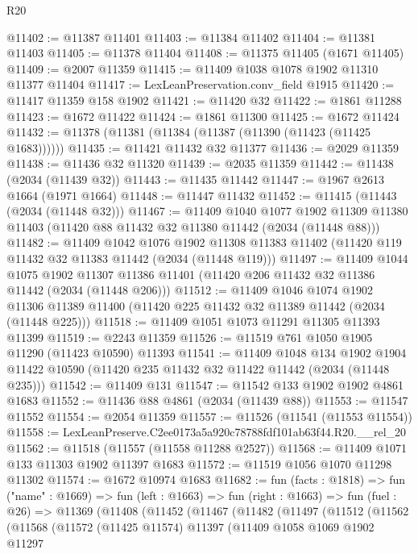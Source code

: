 \begin{lexlean}{R20}
\begin{coremodule}
@11402 := @11387 @11401
@11403 := @11384 @11402
@11404 := @11381 @11403
@11405 := @11378 @11404
@11408 := @11375 @11405 (@1671 @11405)
@11409 := @2007 @11359
@11415 := @11409 @1038 @1078 @1902 @11310 @11377 @11404
@11417 := LexLeanPreservation.conv_field @1915
@11420 := @11417 @11359 @158 @1902
@11421 := @11420 @32
@11422 := @1861 @11288
@11423 := @1672 @11422
@11424 := @1861 @11300
@11425 := @1672 @11424
@11432 := @11378 (@11381 (@11384 (@11387 (@11390 (@11423 (@11425 @1683))))))
@11435 := @11421 @11432 @32 @11377
@11436 := @2029 @11359
@11438 := @11436 @32 @11320
@11439 := @2035 @11359
@11442 := @11438 (@2034 (@11439 @32))
@11443 := @11435 @11442
@11447 := @1967 @2613 @1664 (@1971 @1664)
@11448 := @11447 @11432
@11452 := @11415 (@11443 (@2034 (@11448 @32)))
@11467 := @11409
    @1040
    @1077
    @1902
    @11309
    @11380
    @11403
    (@11420 @88 @11432 @32 @11380 @11442 (@2034 (@11448 @88)))
@11482 := @11409
    @1042
    @1076
    @1902
    @11308
    @11383
    @11402
    (@11420 @119 @11432 @32 @11383 @11442 (@2034 (@11448 @119)))
@11497 := @11409
    @1044
    @1075
    @1902
    @11307
    @11386
    @11401
    (@11420 @206 @11432 @32 @11386 @11442 (@2034 (@11448 @206)))
@11512 := @11409
    @1046
    @1074
    @1902
    @11306
    @11389
    @11400
    (@11420 @225 @11432 @32 @11389 @11442 (@2034 (@11448 @225)))
@11518 := @11409 @1051 @1073 @11291 @11305 @11393 @11399
@11519 := @2243 @11359
@11526 := @11519 @761 @1050 @1905 @11290 (@11423 @10590) @11393
@11541 := @11409
    @1048
    @134
    @1902
    @1904
    @11422
    @10590
    (@11420 @235 @11432 @32 @11422 @11442 (@2034 (@11448 @235)))
@11542 := @11409 @131
@11547 := @11542 @133 @1902 @1902 @4861 @1683
@11552 := @11436 @88 @4861 (@2034 (@11439 @88))
@11553 := @11547 @11552
@11554 := @2054 @11359
@11557 := @11526 (@11541 (@11553 @11554))
@11558 := LexLeanPreserve.C2ee0173a5a920c78788fdf101ab63f44.R20.__rel_20
@11562 := @11518 (@11557 (@11558 @11288 @2527))
@11568 := @11409 @1071 @133 @11303 @1902 @11397 @1683
@11572 := @11519 @1056 @1070 @11298 @11302
@11574 := @1672 @10974 @1683
@11682 := fun (facts : @1818) =>
  fun ("name" : @1669) =>
  fun (left : @1663) =>
  fun (right : @1663) =>
  fun (fuel : @26) =>
  @11369
    (@11408
      (@11452
        (@11467
          (@11482
            (@11497
              (@11512
                (@11562
                  (@11568
                    (@11572
                      (@11425 @11574)
                      @11397
                      (@11409
                        @1058
                        @1069
                        @1902
                        @11297

\end{coremodule}
\end{lexlean}
